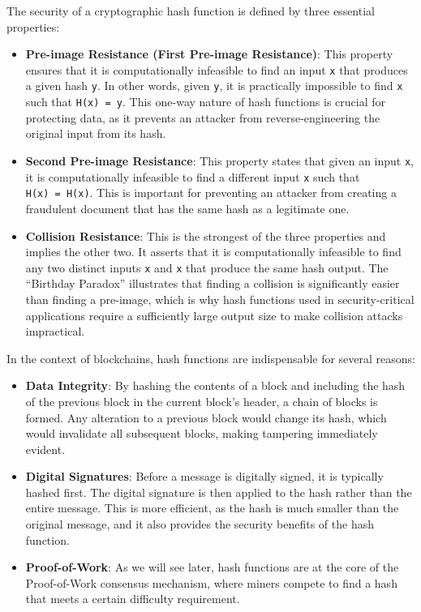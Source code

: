 The security of a cryptographic hash function is defined by three
essential properties:

\begin{itemize}
	\item
	\textbf{Pre-image Resistance (First Pre-image Resistance)}: This
	property ensures that it is computationally infeasible to find an
	input \texttt{x} that produces a given hash \texttt{y}. In other
	words, given \texttt{y}, it is practically impossible to find
	\texttt{x} such that \texttt{H(x)\ =\ y}. This one-way nature of hash
	functions is crucial for protecting data, as it prevents an attacker
	from reverse-engineering the original input from its hash.
	\item
	\textbf{Second Pre-image Resistance}: This property states that given
	an input \texttt{x}, it is computationally infeasible to find a
	different input \texttt{x\textquotesingle{}} such that
	\texttt{H(x)\ =\ H(x\textquotesingle{})}. This is important for
	preventing an attacker from creating a fraudulent document that has
	the same hash as a legitimate one.
	\item
	\textbf{Collision Resistance}: This is the strongest of the three
	properties and implies the other two. It asserts that it is
	computationally infeasible to find any two distinct inputs \texttt{x}
	and \texttt{x\textquotesingle{}} that produce the same hash output.
	The ``Birthday Paradox'' illustrates that finding a collision is
	significantly easier than finding a pre-image, which is why hash
	functions used in security-critical applications require a
	sufficiently large output size to make collision attacks impractical.
\end{itemize}

In the context of blockchains, hash functions are indispensable for
several reasons:

\begin{itemize}
	\tightlist
	\item
	\textbf{Data Integrity}: By hashing the contents of a block and
	including the hash of the previous block in the current block's
	header, a chain of blocks is formed. Any alteration to a previous
	block would change its hash, which would invalidate all subsequent
	blocks, making tampering immediately evident.
	\item
	\textbf{Digital Signatures}: Before a message is digitally signed, it
	is typically hashed first. The digital signature is then applied to
	the hash rather than the entire message. This is more efficient, as
	the hash is much smaller than the original message, and it also
	provides the security benefits of the hash function.
	\item
	\textbf{Proof-of-Work}: As we will see later, hash functions are at
	the core of the Proof-of-Work consensus mechanism, where miners
	compete to find a hash that meets a certain difficulty requirement.
\end{itemize}

